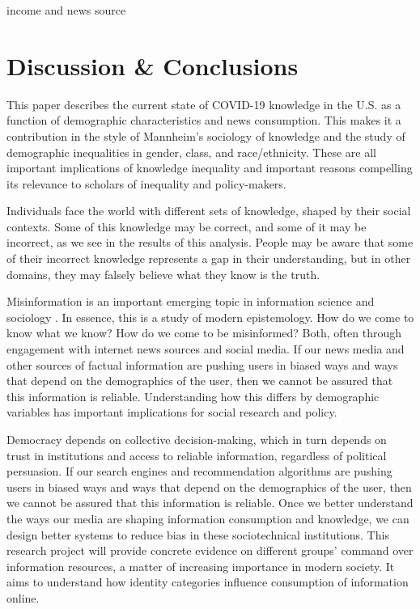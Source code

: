 \documentclass[11pt]{article}
\begin{document}
 income and news source



\section{Discussion \& Conclusions}\label{sec:conclusion}

This paper describes the current state of COVID-19 knowledge in the U.S. as a
function of demographic characteristics and news consumption. This makes it a
contribution in the style of Mannheim's sociology of knowledge
\citep{Mannheim1929,Swidler1994} and the study of demographic inequalities in
gender, class, and race/ethnicity. These are all important implications of
knowledge inequality and important reasons compelling its relevance to scholars
of inequality and policy-makers.

Individuals face the world with different sets of knowledge, shaped by their
social contexts. Some of this knowledge may be correct, and some of it may be
incorrect, as we see in the results of this analysis. People may be aware that
some of their incorrect knowledge represents a gap in their understanding, but
in other domains, they may falsely believe what they know is the truth.


Misinformation is an important emerging topic in
information science and sociology \citep{Metaxa-Kakavouli2017}. In essence, this
is a study of modern epistemology. How do we come to know what we know? How do
we come to be misinformed? Both, often through engagement with internet news
sources and social media. If our news media and other sources of factual
information are pushing users in biased ways and ways that depend on the
demographics of the user, then we cannot be assured that this information is
reliable. Understanding how this differs by demographic variables has important
implications for social research and policy.

Democracy depends on collective decision-making, which in turn depends on trust
in institutions and access to reliable information, regardless of political
persuasion. If our search engines and recommendation algorithms are pushing
users in biased ways and ways that depend on the demographics of the user, then
we cannot be assured that this information is reliable. Once we better
understand the ways our media are shaping information consumption and knowledge,
we can design better systems to reduce bias in these sociotechnical
institutions. This research project will provide concrete evidence on different
groups' command over information resources, a matter of increasing importance in
modern society. It aims to understand how identity categories influence
consumption of information online.
\end{document}
